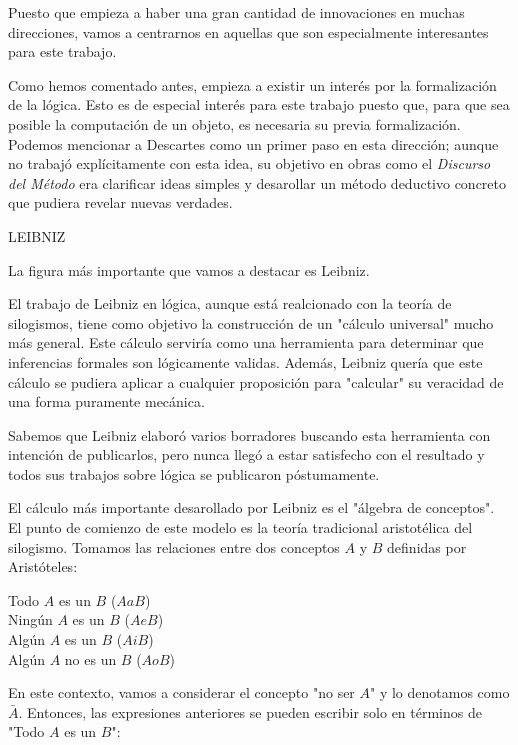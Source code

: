 \documentclass{article}
\begin{document}
Puesto que empieza a haber una gran cantidad de innovaciones en muchas direcciones, vamos a centrarnos en aquellas que son especialmente interesantes para este trabajo.

Como hemos comentado antes, empieza a existir un interés por la formalización de la lógica. Esto es de especial interés para este trabajo puesto que, para que sea posible la computación de un objeto, es necesaria su previa formalización. Podemos mencionar a Descartes como un primer paso en esta dirección; aunque no trabajó explícitamente con esta idea, su objetivo en obras como el \textit{Discurso del Método} era clarificar ideas simples y desarollar un método deductivo concreto que pudiera revelar nuevas verdades\cite{wahl2008port}.

LEIBNIZ

La figura más importante que vamos a destacar es Leibniz.

El trabajo de Leibniz en lógica, aunque está realcionado con la teoría de silogismos, tiene como objetivo la construcción de un "cálculo universal" mucho más general. Este cálculo serviría como una herramienta para determinar que inferencias formales son lógicamente validas. Además, Leibniz quería que este cálculo se pudiera aplicar a cualquier proposición para "calcular" su veracidad de una forma puramente mecánica.

Sabemos que Leibniz elaboró varios borradores buscando esta herramienta con intención de publicarlos, pero nunca llegó a estar satisfecho con el resultado y todos sus trabajos sobre lógica se publicaron póstumamente.

El cálculo más importante desarollado por Leibniz es el "álgebra de conceptos". El punto de comienzo de este modelo es la teoría tradicional aristotélica del silogismo. Tomamos las relaciones entre dos conceptos $A$ y $B$ definidas por Aristóteles:

\begin{displayquote}
    Todo $A$ es un $B$ ($AaB$)\\
    Ningún $A$ es un $B$ ($AeB$)\\
    Algún $A$ es un $B$ ($AiB$)\\
    Algún $A$ no es un $B$ ($AoB$)\\
\end{displayquote}

En este contexto, vamos a considerar el concepto "no ser $A$" y lo denotamos como $\bar{A}$. Entonces, las expresiones anteriores se pueden escribir solo en términos de "Todo $A$ es un $B$":
\end{document}
